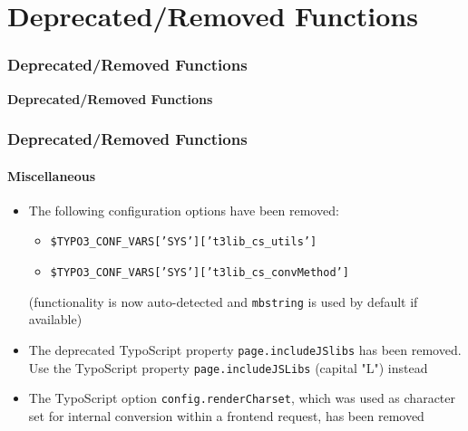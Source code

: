 %

\section{Deprecated/Removed Functions}
\begin{frame}[fragile]
	\frametitle{Deprecated/Removed Functions}

	\begin{center}\huge{\color{typo3darkgrey}\textbf{Deprecated/Removed Functions}}\end{center}
	\begin{center}\large{\textit{}}\end{center}

\end{frame}


\begin{frame}[fragile]
	\frametitle{Deprecated/Removed Functions}
	\framesubtitle{Miscellaneous}

	\begin{itemize}

		\item The following configuration options have been removed:

			\begin{itemize}
				\item \texttt{\$TYPO3\_CONF\_VARS['SYS']['t3lib\_cs\_utils']}
				\item \texttt{\$TYPO3\_CONF\_VARS['SYS']['t3lib\_cs\_convMethod']}
			\end{itemize}

			\small
				(functionality is now auto-detected and \texttt{mbstring} is
				used by default if available)
			\normalsize

		\item The deprecated TypoScript property \texttt{page.includeJSlibs} has
			been removed. Use the TypoScript property \texttt{page.includeJSLibs}
			(capital "L") instead

		\item The TypoScript option \texttt{config.renderCharset}, which was used
			as character set for internal conversion within a frontend request,
			has been removed

	\end{itemize}

\end{frame}

